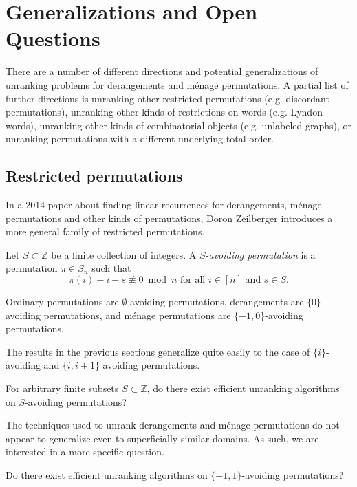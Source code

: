 

\section{Generalizations and Open Questions}

There are a number of different directions and potential generalizations of
unranking problems for derangements and m\'enage permutations.
A partial list of further directions is
unranking other restricted permutations
(e.g. discordant permutations),
unranking other kinds of restrictions on words
(e.g. Lyndon words),
unranking other kinds of combinatorial objects
(e.g. unlabeled graphs), or
unranking permutations with a different underlying total order.
%
\subsection{Restricted permutations}
In a 2014 paper about finding linear recurrences for derangements, m\'enage
permutations and other kinds of permutations, Doron Zeilberger
introduces a more general family of restricted permutations.
\begin{definition}
  Let $S \subset \mathbb Z$ be a finite collection of integers.
  A \textit{$S$-avoiding permutation} is a permutation $\pi \in S_n$ such that
  \[
    \pi(i) - i - s \not\equiv 0 \bmod n \text{ for all } i \in [n] \text{ and } s \in S.
  \]
\end{definition}

\begin{example}
  Ordinary permutations are $\emptyset$-avoiding permutations,
  derangements are $\{0\}$-avoiding permutations,
  and m\'enage permutations are $\{-1,0\}$-avoiding permutations.
\end{example}

The results in the previous sections generalize quite easily to the case of
$\{i\}$-avoiding and $\{i, i+1\}$ avoiding permutations.

\begin{openquestion}
  For arbitrary finite subsets $S \subset \mathbb Z$,
  do there exist efficient unranking algorithms on $S$-avoiding permutations?
\end{openquestion}

The techniques used to unrank derangements and m\'enage permutations do
not appear to generalize even to superficially similar domains.
As such, we are interested in a more specific question.
\begin{openquestion}
  Do there exist efficient unranking algorithms on $\{-1, 1\}$-avoiding
  permutations?
\end{openquestion}

